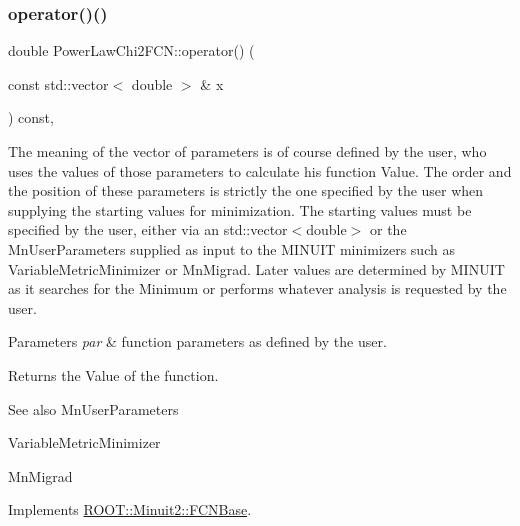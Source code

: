 \mbox{\label{classPowerLawChi2FCN_a60b7b03daefc8250dcaaa2d4937f4bfc}} 
\subsubsection{\texorpdfstring{operator()()}{operator()()}\hspace{0.1cm}{\footnotesize\ttfamily [2/2]}}
{\footnotesize\ttfamily double Power\+Law\+Chi2\+F\+C\+N\+::operator() (\begin{DoxyParamCaption}\item[{const std\+::vector$<$ double $>$ \&}]{x }\end{DoxyParamCaption}) const\hspace{0.3cm}{\ttfamily [inline]}, {\ttfamily [virtual]}}

The meaning of the vector of parameters is of course defined by the user, who uses the values of those parameters to calculate his function Value. The order and the position of these parameters is strictly the one specified by the user when supplying the starting values for minimization. The starting values must be specified by the user, either via an std\+::vector$<$double$>$ or the Mn\+User\+Parameters supplied as input to the M\+I\+N\+U\+IT minimizers such as Variable\+Metric\+Minimizer or Mn\+Migrad. Later values are determined by M\+I\+N\+U\+IT as it searches for the Minimum or performs whatever analysis is requested by the user.


\begin{DoxyParams}{Parameters}
{\em par} & function parameters as defined by the user.\\
\hline
\end{DoxyParams}
\begin{DoxyReturn}{Returns}
the Value of the function.
\end{DoxyReturn}
\begin{DoxySeeAlso}{See also}
Mn\+User\+Parameters 

Variable\+Metric\+Minimizer 

Mn\+Migrad 
\end{DoxySeeAlso}


Implements \mbox{\hyperlink{classROOT_1_1Minuit2_1_1FCNBase_ae4a86bd94d0d0f5ca6fc8f8ab2bb43cd}{R\+O\+O\+T\+::\+Minuit2\+::\+F\+C\+N\+Base}}.

\mbox{\label{classPowerLawChi2FCN_ad202014937fe0e66dffc0fa9061ca9df}} 
